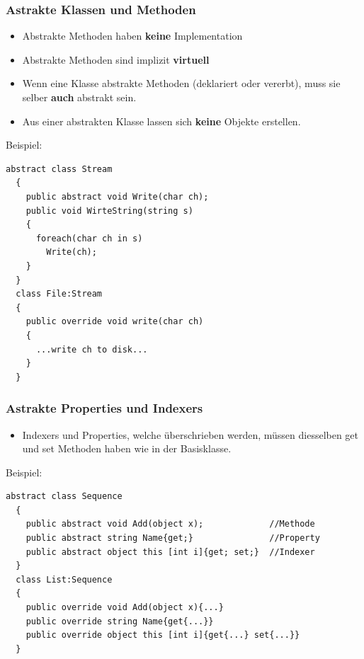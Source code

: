 \subsubsection{Astrakte Klassen und Methoden}
\begin{itemize}
  \item Abstrakte Methoden haben \textbf{keine} Implementation
  \item Abstrakte Methoden sind implizit \textbf{virtuell}
  \item Wenn eine Klasse abstrakte Methoden (deklariert oder vererbt), muss sie
  selber \textbf{auch} abstrakt sein. 
  \item Aus einer abstrakten Klasse lassen sich \textbf{keine} Objekte
  erstellen. 
\end{itemize}
Beispiel: 
\begin{lstlisting}[style=C]
  abstract class Stream
  {
    public abstract void Write(char ch);
    public void WirteString(string s)
    {
      foreach(char ch in s) 
        Write(ch); 
    }
  }
  class File:Stream
  {
    public override void write(char ch)
    {
      ...write ch to disk...
    }
  }
\end{lstlisting}

\subsubsection{Astrakte Properties und Indexers}
\begin{itemize}
  \item Indexers und Properties, welche überschrieben werden, müssen diesselben
  get und set Methoden haben wie in der Basisklasse.
\end{itemize}
Beispiel: 
\begin{lstlisting}[style=C]
  abstract class Sequence
  {
    public abstract void Add(object x);             //Methode
    public abstract string Name{get;}               //Property
    public abstract object this [int i]{get; set;}  //Indexer   
  }
  class List:Sequence
  {
    public override void Add(object x){...}
    public override string Name{get{...}}
    public override object this [int i]{get{...} set{...}}
  }
\end{lstlisting}

